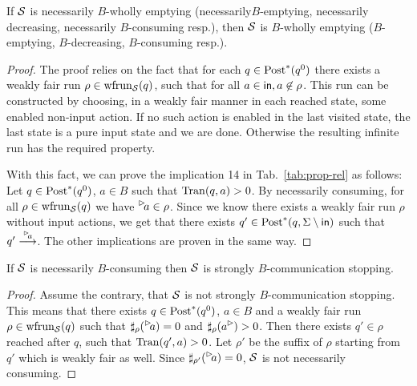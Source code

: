 \begin{proposition}\label{prop2}
 If $\S$ is necessarily $B$-wholly emptying (necessarily\linebreak $B$-emptying, necessarily decreasing, necessarily $B$-consuming resp.), then $\S$ is $B$-wholly emptying ($B$-emptying, $B$-decreasing, $B$-consuming resp.).
\end{proposition}
\begin{proof}
    The proof relies on the fact that for each $q \in \post^*(q^0)$ there exists a weakly fair run $\rho \in \frun{\S}(q)$, such that for all $a \in \inset, a \not\in \rho$. This run can be constructed by choosing, in a weakly fair manner in each reached state, some enabled non-input action. If no such action is enabled in the last visited state, the last state is a pure input state and we are done. Otherwise the resulting infinite run has the required property.

    With this fact, we can prove the implication 14 in Tab.~\ref{tab:prop-rel} as follows: Let $q \in \post^*(q^0)$, $a \in B$ such that $\val(q,a) > 0$. By necessarily consuming, for all $\rho \in \frun{\S}(q)$ we have $\inact{a} \in \rho$. Since we know there exists a weakly fair run $\rho$ without input actions, we get that there exists $q' \in \post^*(q,\Sigma \setminus \inset)$ such that $q'\goes{\inact{a}}$.
    The other implications are proven in the same way. 
\end{proof}

\begin{proposition}\label{prop3}
 If $\S$ is necessarily $B$-consuming then $\S$ is strongly \linebreak $B$-communication stopping.
\end{proposition}
\begin{proof}
    Assume the contrary, that $\S$ is not strongly $B$-communication stopping. This means that there exists $q \in \post^*(q^0) $, $a \in B$ and a weakly fair run $\rho \in \frun{\S}(q)$ such that $\sharp_\rho(\inact{a}) = 0$ and $\sharp_\rho(\outact{a}) > 0$. Then there exists $q' \in \rho$ reached after $q$, such that $\val(q',a) > 0$. Let $\rho'$ be the suffix of $\rho$ starting from $q'$ which is weakly fair as well. Since $\sharp_{\rho'}(\inact{a}) = 0$, $\S$ is not necessarily consuming.
\end{proof}

